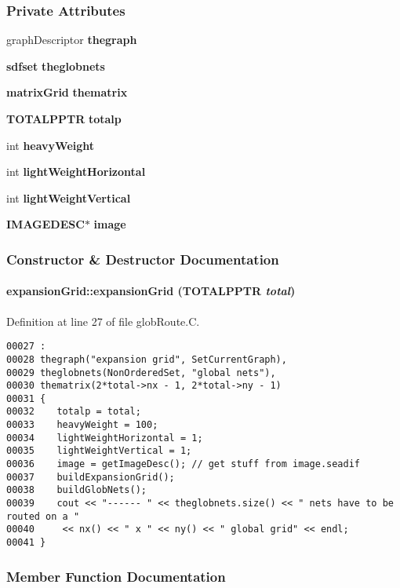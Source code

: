 \subsubsection*{Private Attributes}
\begin{CompactItemize}
\item 
graph\-Descriptor {\bf thegraph}
\item 
{\bf sdfset} {\bf theglobnets}
\item 
{\bf matrix\-Grid} {\bf thematrix}
\item 
{\bf TOTALPPTR} {\bf totalp}
\item 
int {\bf heavy\-Weight}
\item 
int {\bf light\-Weight\-Horizontal}
\item 
int {\bf light\-Weight\-Vertical}
\item 
{\bf IMAGEDESC}$\ast$ {\bf image}
\end{CompactItemize}


\subsubsection{Constructor \& Destructor Documentation}
\label{expansionGrid_a0}
\paragraph{\setlength{\rightskip}{0pt plus 5cm}expansion\-Grid::expansion\-Grid ({\bf TOTALPPTR} {\em total})}\hfill



Definition at line 27 of file glob\-Route.C.\small\begin{verbatim}00027 :
00028 thegraph("expansion grid", SetCurrentGraph),
00029 theglobnets(NonOrderedSet, "global nets"),
00030 thematrix(2*total->nx - 1, 2*total->ny - 1)
00031 {
00032    totalp = total;
00033    heavyWeight = 100;
00034    lightWeightHorizontal = 1;
00035    lightWeightVertical = 1;
00036    image = getImageDesc(); // get stuff from image.seadif
00037    buildExpansionGrid();
00038    buildGlobNets();
00039    cout << "------ " << theglobnets.size() << " nets have to be routed on a "
00040     << nx() << " x " << ny() << " global grid" << endl;
00041 }

\end{verbatim}\normalsize 


\subsubsection{Member Function Documentation}
\label{expansionGrid_c9}
